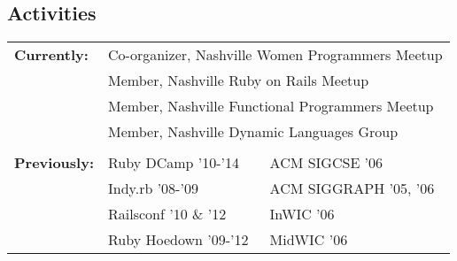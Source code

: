 \documentclass[line, margin, 10pt]{res}
\begin{document}
\begin{resume}
\section{Activities}
\begin{tabular}[t]{@{} p{1.2in} p{1.9in} p{1.9in} @{}}
\bf{Currently:}

& \multicolumn{2}{p{3.8in}}{ Co-organizer, Nashville Women Programmers Meetup} \\
& \multicolumn{2}{p{3.8in}}{ Member, Nashville Ruby on Rails Meetup} \\
& \multicolumn{2}{p{3.8in}}{ Member, Nashville Functional Programmers Meetup} \\
& \multicolumn{2}{p{3.8in}}{ Member, Nashville Dynamic Languages Group} \\
\\
\bf{Previously:}
& Ruby DCamp '10-'14 & ACM SIGCSE '06  \\
& Indy.rb '08-'09 & ACM SIGGRAPH '05, '06 \\
& Railsconf '10 \& '12 &  InWIC '06 \\
& Ruby Hoedown '09-'12 & MidWIC '06 \\
\end{tabular}
\end{resume}
\end{document}
